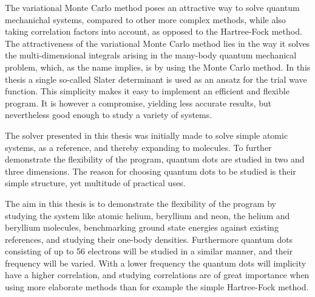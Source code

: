 The variational Monte Carlo method poses an attractive way to solve
quantum mechanichal systems, compared to other more complex methods,
while also taking correlation factors into account, as opposed to the
Hartree-Fock method. The attractiveness of the variational Monte Carlo
method lies in the way it solves the multi-dimensional integrals
arising in the many-body quantum mechanical problem, which, as the
name implies, is by using the Monte Carlo method. In this thesis a
single so-called Slater determinant is used as an ansatz for the trial
wave function. This simplicity makes it easy to implement an efficient
and flexible program. It is however a compromise, yielding less
accurate results, but nevertheless good enough to study a variety of
systems.

The solver presented in this thesis was initially made to solve simple
atomic systems, as a reference, and thereby expanding to molecules. To further
demonstrate the flexibility of the program, quantum dots are studied
in two and three dimensions. The reason for choosing quantum dots to
be studied is their simple structure, yet multitude of practical uses.




The aim in this thesis is to demonstrate the flexibility of the
program by studying the system like atomic helium, beryllium and neon,
the helium and beryllium molecules, benchmarking ground state energies
against existing references, and studying their one-body densities. Furthermore
quantum dots consisting of up to 56 electrons will be studied in a
similar manner, and their frequency will be varied.  With a lower
frequency the quantum dots will implicity have a higher correlation,
and studying correlations are of great importance when using more
elaborate methods than for example the simple Hartree-Fock method.

